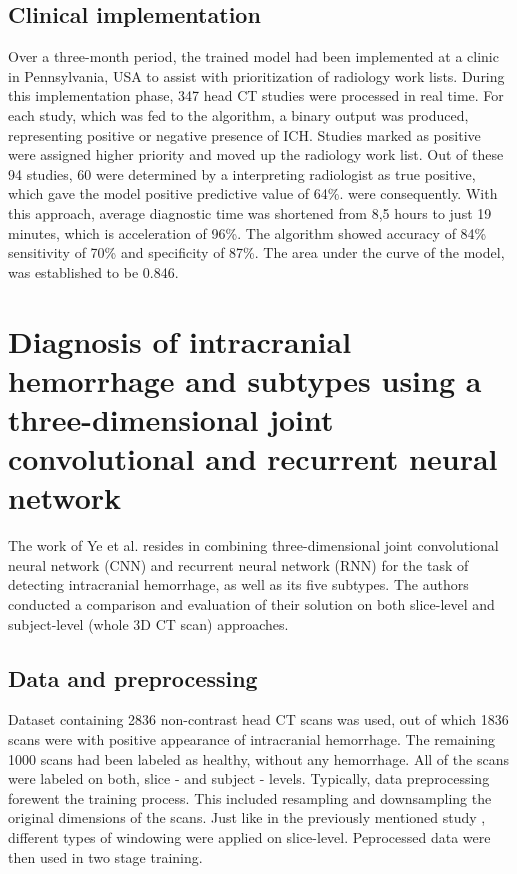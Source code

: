 \subsection*{Clinical implementation} 
Over a three-month period, the trained model had been implemented at a clinic in Pennsylvania, USA to assist with prioritization of radiology work lists. During this implementation phase, 347 head CT studies were processed in real time. For each study, which was fed to the algorithm, a binary output was produced, representing positive or negative presence of ICH. Studies marked as positive were assigned higher priority and moved up the radiology work list. Out of these 94 studies, 60 were determined by a interpreting radiologist as true positive, which gave the model positive predictive value of 64\%. were consequently. With this approach, average diagnostic time was shortened from 8,5 hours to just 19 minutes, which is acceleration of 96\%. The algorithm showed accuracy of 84\% sensitivity of 70\%  and specificity of 87\%. The area under the curve of the model, was established to be 0.846.


\section{Diagnosis of intracranial hemorrhage and subtypes using a three-dimensional joint convolutional and recurrent neural network}

The work of Ye et al. \cite{relatedWork2} resides in combining three-dimensional joint convolutional neural network (CNN) and recurrent neural network (RNN) for the task of detecting intracranial hemorrhage, as well as its five subtypes. The authors conducted a comparison and evaluation of their solution on both slice-level and subject-level (whole 3D CT scan) approaches.

\subsection*{Data and preprocessing}
Dataset containing 2836 non-contrast head CT scans was used, out of which 1836 scans were with positive appearance of intracranial hemorrhage. The remaining 1000 scans had been labeled as healthy, without any hemorrhage. All of the scans were labeled on both, slice - and subject - levels. Typically, data preprocessing forewent the training process. This included resampling and downsampling the original dimensions of the scans. Just like in the previously mentioned study \cite{relatedWork1}, different types of windowing were applied on slice-level. Peprocessed data were then used in two stage training. 
